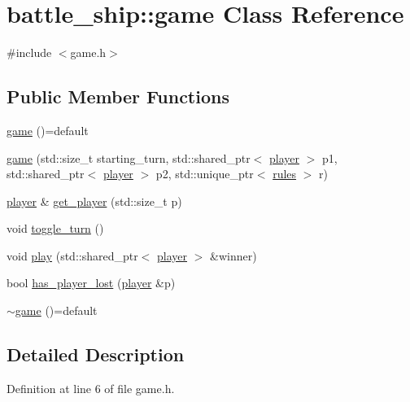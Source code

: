 \hypertarget{classbattle__ship_1_1game}{}\section{battle\+\_\+ship\+:\+:game Class Reference}
\label{classbattle__ship_1_1game}


{\ttfamily \#include $<$game.\+h$>$}

\subsection*{Public Member Functions}
\begin{DoxyCompactItemize}
\item 
\hyperlink{classbattle__ship_1_1game_a3a98cd01dec3c29d91d057049c421c89}{game} ()=default
\item 
\hyperlink{classbattle__ship_1_1game_a172670fffc6e5b3942ddcd41b2f2840a}{game} (std\+::size\+\_\+t starting\+\_\+turn, std\+::shared\+\_\+ptr$<$ \hyperlink{classbattle__ship_1_1player}{player} $>$ p1, std\+::shared\+\_\+ptr$<$ \hyperlink{classbattle__ship_1_1player}{player} $>$ p2, std\+::unique\+\_\+ptr$<$ \hyperlink{classbattle__ship_1_1rules}{rules} $>$ r)
\item 
\hyperlink{classbattle__ship_1_1player}{player} \& \hyperlink{classbattle__ship_1_1game_abdbbd12c9a8b272e2a9fabed8ea90922}{get\+\_\+player} (std\+::size\+\_\+t p)
\item 
void \hyperlink{classbattle__ship_1_1game_a0e5a85f6c1f0cff5e1104545b5222026}{toggle\+\_\+turn} ()
\item 
void \hyperlink{classbattle__ship_1_1game_a8bd311ac1aaab0a16c06b4f1b9664af4}{play} (std\+::shared\+\_\+ptr$<$ \hyperlink{classbattle__ship_1_1player}{player} $>$ \&winner)
\item 
bool \hyperlink{classbattle__ship_1_1game_a2f6eceb02db97507f52e08c1dafcf5e4}{has\+\_\+player\+\_\+lost} (\hyperlink{classbattle__ship_1_1player}{player} \&p)
\item 
\hyperlink{classbattle__ship_1_1game_aa95dac5c30c567ae407a3b67ceae324d}{$\sim$game} ()=default
\end{DoxyCompactItemize}


\subsection{Detailed Description}


Definition at line 6 of file game.\+h.



